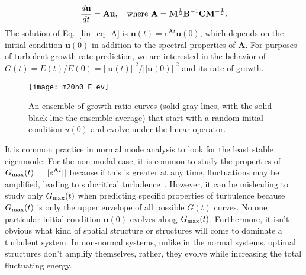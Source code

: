 \documentclass[letter,scriptaddress,twocolumn, prl,showkeys]{revtex4}
\def\beq{\begin{equation}}
\def\eeq{\end{equation}}
\newcommand{\diff}[2]{\frac{d#1}{d#2}}
\begin{document}
\beq
\label{lin_eq_A}
\diff{\mathbf{u}}{t} = \mathbf{A} \mathbf{u},  \quad \rm{where} \ \mathbf{A} = \mathbf{M}^{\frac{1}{2}} \mathbf{B}^{-1} \mathbf{C} \mathbf{M}^{-\frac{1}{2}}.
\eeq
The solution of Eq.~\ref{lin_eq_A} is $\mathbf{u}(t) = e^{\mathbf{A} t} \mathbf{u}(0)$, which
depends on the initial condition $\mathbf{u}(0)$ in addition to the spectral properties of $\mathbf{A}$. For purposes of turbulent growth rate prediction, we are interested in
the behavior of $G(t) = E(t)/E(0) = ||\mathbf{u}(t)||^2/||\mathbf{u}(0)||^2$ and its rate of growth.


\begin{figure}
\centerline{\texttt{[image: m20n0\_E\_ev]}}
\caption{An ensemble of growth ratio curves (solid gray lines, with the solid black line the ensemble average)
that start with a random initial condition $u(0)$ and evolve under the linear operator.}
\label{m20n0_E_ev}
\end{figure}

It is common practice in normal mode analysis to look for the least stable eigenmode. 
For the non-modal case, it is common to study the properties of $G_{\rm{max}}(t) = ||e^{\mathbf{A} t}||$ because if this is greater at any time, fluctuations may be amplified, 
leading to subcritical turbulence~\cite{trefethen2005,schmid2007}.
However, it can be misleading to study only $G_{\rm{max}}(t)$ when predicting specific properties of turbulence because
$G_{\rm{max}}(t)$ is only the upper envelope of all possible $G(t)$ curves. No one particular initial condition $\mathbf{u}(0)$ evolves along $G_{\rm{max}}(t)$. 
Furthermore, it isn't obvious what kind of spatial structure or structures will come to dominate a turbulent system.
In non-normal systems, unlike in the normal systems, optimal structures don't amplify themselves, rather, they evolve while increasing the total fluctuating energy.
\end{document}
